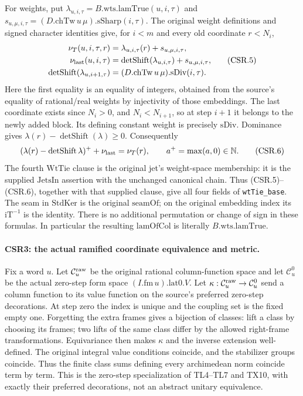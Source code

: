 For weights, put \(\lambda_{u,i,\tau}=B.\mathrm{wts.lamTrue}(u,i,\tau)\)
and \(s_{u,\mu,i,\tau}=(D.\mathrm{chTw}\,u\,\mu).\mathrm{sSharp}(i,\tau)\).
The original weight definitions and signed character identities give,
for \(i<m\) and every old coordinate \(r<N_i\),
\[
 \begin{split}
 \nu_T(u,i,\tau,r)&=\lambda_{u,i,\tau}(r)+s_{u,\mu,i,\tau},\\
 \nu_{\rm last}(u,i,\tau)
   &=\operatorname{detShift}(\lambda_{u,i,\tau})+s_{u,\mu,i,\tau},\\
 \operatorname{detShift}(\lambda_{u,i+1,\tau})
   &=(D.\mathrm{chTw}\,u\,\mu).\mathrm{sDiv}(i,\tau).
 \end{split}                                                    \tag{CSR.5}
\]
Here the first equality is an equality of integers, obtained from the
source's equality of rational/real weights by injectivity of those
embeddings. The last coordinate exists since \(N_i>0\), and
\(N_i<N_{i+1}\), so at step \(i+1\) it belongs to the newly added
block. Its defining constant weight is precisely \(\mathrm{sDiv}\).
Dominance gives
\(\lambda(r)-\operatorname{detShift}(\lambda)\ge0\). Consequently
\[
 (\lambda(r)-\operatorname{detShift}\lambda)^{+}+\nu_{\rm last}
       =\nu_T(r),\qquad a^{+}=\max(a,0)\in\mathbb N .
 \tag{CSR.6}
\]
The fourth \(\mathrm{WtTie}\) clause is the original
jet's weight-space membership: it is the supplied
\(\mathrm{JetsIn}\) assertion with the unchanged canonical chain.
Thus (CSR.5)--(CSR.6), together with that supplied clause, give all
four fields of \texttt{wtTie\_base}. The seam in
\(\mathrm{StdKer}\) is the original \(\mathrm{seamOf}\); on the
original embedding index its \(\mathrm{iT}^{-1}\) is the identity.
There is no additional permutation or change of sign in these
formulas. In particular the resulting \(\mathrm{lamOfCol}\) is
literally \(B.\mathrm{wts.lamTrue}\).

\paragraph{CSR3: the actual ramified coordinate equivalence and metric.}
\label{claim:CSR3}
Fix a word \(u\). Let \(\mathcal C_u^{\rm raw}\) be the original
rational column-function space and let \(\mathcal C_u^{0}\)
be the actual zero-step form space \((I.\mathrm{fm}\,u).\mathrm{lat0}.V\).
Let \(\kappa:\mathcal C_u^{\rm raw}\to\mathcal C_u^{0}\)
send a column function to its value function on the source's
preferred zero-step decorations.
At step zero the index is unique and the coupling set is the fixed
empty one. Forgetting the extra frames gives a bijection of classes:
lift a class by choosing its frames; two lifts of the same class
differ by the allowed right-frame transformations. Equivariance then
makes \(\kappa\) and the inverse extension well-defined.
The original integral value conditions coincide, and the
stabilizer groups coincide. Thus the finite class sums defining
every archimedean norm coincide term by term. This is the zero-step
specialization of TL4--TL7 and TX10, with exactly their preferred
decorations, not an abstract unitary equivalence.

